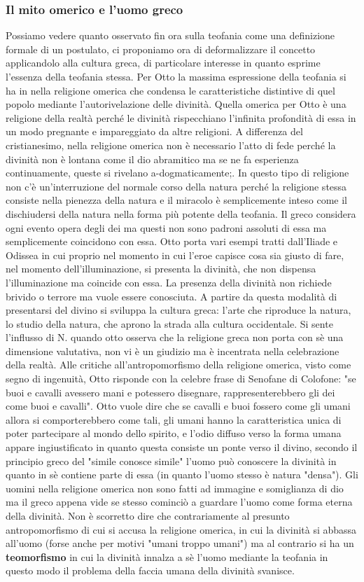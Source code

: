 \documentclass[10pt,a4paper]{article}
\begin{document}
\subsubsection{Il mito omerico e l'uomo greco}
Possiamo vedere quanto osservato fin ora sulla teofania come una definizione formale di un postulato, ci proponiamo ora di deformalizzare il concetto applicandolo alla cultura greca, di particolare interesse in quanto esprime l'essenza della teofania stessa. Per Otto la massima espressione della teofania si ha in nella religione omerica che condensa le caratteristiche distintive di quel popolo mediante l'autorivelazione delle divinità. Quella omerica per Otto è una religione della realtà perché le divinità rispecchiano l'infinita profondità di essa in un modo pregnante e impareggiato da altre religioni. A differenza del cristianesimo, nella religione omerica non è necessario l'atto di fede perché la divinità non è lontana come il dio abramitico ma se ne fa esperienza continuamente, queste si rivelano a-dogmaticamente;. In questo tipo di religione non c'è un'interruzione del normale corso della natura perché la religione stessa consiste nella pienezza della natura e il miracolo è semplicemente inteso come il dischiudersi della natura nella forma più potente della teofania. Il greco considera ogni evento opera degli dei ma questi non sono padroni assoluti di essa ma semplicemente coincidono con essa. Otto porta vari esempi tratti dall'Iliade e Odissea in cui proprio nel momento in cui l'eroe capisce cosa sia giusto di fare, nel momento dell'illuminazione, si presenta la divinità, che non dispensa l'illuminazione ma coincide con essa. La presenza della divinità non richiede brivido o terrore ma vuole essere conosciuta. A partire da questa modalità di presentarsi del divino si sviluppa la cultura greca: l'arte che riproduce la natura, lo studio della natura, che aprono la strada alla cultura occidentale. Si sente l'influsso di N. quando otto osserva che la religione greca non porta con sè una dimensione valutativa, non vi è un giudizio ma è incentrata nella celebrazione della realtà. Alle critiche all'antropomorfismo della religione omerica, visto come segno di ingenuità, Otto risponde con la celebre frase di Senofane di Colofone: "se buoi e cavalli avessero mani e potessero disegnare, rappresenterebbero gli dei come buoi e cavalli". Otto vuole dire che se cavalli e buoi fossero come gli umani allora si comporterebbero come tali, gli umani hanno la caratteristica unica di poter partecipare al mondo dello spirito, e l'odio diffuso verso la forma umana appare ingiustificato in quanto questa consiste un ponte verso il divino, secondo il principio greco del "simile conosce simile" l'uomo può conoscere la divinità in quanto in sè contiene parte di essa (in quanto l'uomo stesso è natura "densa"). Gli uomini nella religione omerica non sono fatti ad immagine e somiglianza di dio ma il greco appena vide se stesso cominciò a guardare l'uomo come forma eterna della divinità. Non è scorretto dire che contrariamente al presunto antropomorfismo di cui si accusa la religione omerica, in cui la divinità si abbassa all'uomo (forse anche per motivi "umani troppo umani") ma al contrario si ha un \textbf{teomorfismo} in cui la divinità innalza a sè l'uomo mediante la teofania in questo modo il problema della faccia umana della divinità svanisce. 
\end{document}
